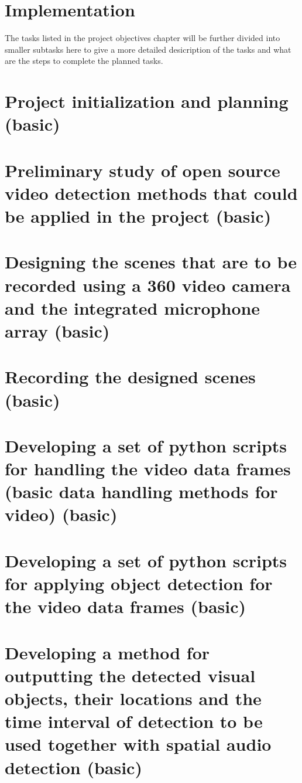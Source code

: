 \section{Implementation}

The tasks listed in the project objectives chapter will be further divided into smaller subtasks here to give a more detailed desicription of the tasks and what are the steps to complete the planned tasks. 

\section{Project initialization and planning (basic)}

\section{Preliminary study of open source video detection methods that could be applied in the project (basic)}

\section{Designing the scenes that are to be recorded using a 360 video camera and the integrated microphone array (basic)}

\section{Recording the designed scenes (basic)}

\section{Developing a set of python scripts for handling the video data frames (basic data handling methods for video) (basic)}

\section{Developing a set of python scripts for applying object detection for the video data frames (basic)}

\section{Developing a method for outputting the detected visual objects, their locations and the time interval of detection to be used together with spatial audio detection (basic)}

